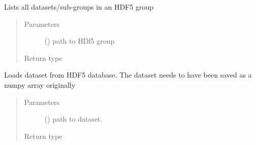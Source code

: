 \documentclass[letterpaper,10pt,english]{sphinxmanual}
\begin{document}
\begin{fulllineitems}
\begin{fulllineitems}
\begin{quote}
\begin{description}
\end{description}\end{quote}

\end{fulllineitems}


\begin{fulllineitems}
\label{\detokenize{shared:mleap.shared.files_io.FilesIO.list_datasets}}
Lists all datasets/sub-groups in an HDF5 group
\begin{quote}\begin{description}
\item[{Parameters}] \leavevmode
{} () \textendash{} path to HDf5 group

\item[{Return type}] \leavevmode
{}

\end{description}\end{quote}

\end{fulllineitems}


\begin{fulllineitems}
\label{\detokenize{shared:mleap.shared.files_io.FilesIO.load_dataset_h5}}
Loads dataset from HDF5 database. 
The dataset needs to have been saved as a numpy array originally
\begin{quote}\begin{description}
\item[{Parameters}] \leavevmode
{} () \textendash{} path to dataset.

\item[{Return type}] \leavevmode
{}

\end{description}\end{quote}

\end{fulllineitems}



\end{fulllineitems}
\end{document}

